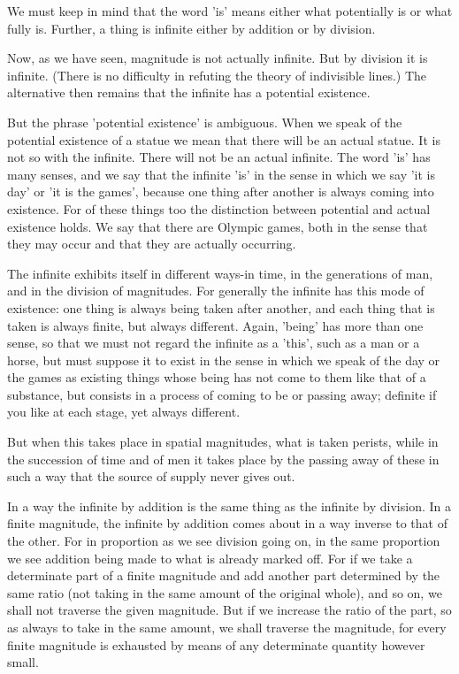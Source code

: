 We must keep in mind that the word 'is' means either what potentially
is or what fully is. Further, a thing is infinite either by addition
or by division. 

Now, as we have seen, magnitude is not actually infinite. But by division
it is infinite. (There is no difficulty in refuting the theory of
indivisible lines.) The alternative then remains that the infinite
has a potential existence. 

But the phrase 'potential existence' is ambiguous. When we speak of
the potential existence of a statue we mean that there will be an
actual statue. It is not so with the infinite. There will not be an
actual infinite. The word 'is' has many senses, and we say that the
infinite 'is' in the sense in which we say 'it is day' or 'it is the
games', because one thing after another is always coming into existence.
For of these things too the distinction between potential and actual
existence holds. We say that there are Olympic games, both in the
sense that they may occur and that they are actually occurring.

The infinite exhibits itself in different ways-in time, in the generations
of man, and in the division of magnitudes. For generally the infinite
has this mode of existence: one thing is always being taken after
another, and each thing that is taken is always finite, but always
different. Again, 'being' has more than one sense, so that we must
not regard the infinite as a 'this', such as a man or a horse, but
must suppose it to exist in the sense in which we speak of the day
or the games as existing things whose being has not come to them like
that of a substance, but consists in a process of coming to be or
passing away; definite if you like at each stage, yet always different.

But when this takes place in spatial magnitudes, what is taken perists,
while in the succession of time and of men it takes place by the passing
away of these in such a way that the source of supply never gives
out. 

In a way the infinite by addition is the same thing as the infinite
by division. In a finite magnitude, the infinite by addition comes
about in a way inverse to that of the other. For in proportion as
we see division going on, in the same proportion we see addition being
made to what is already marked off. For if we take a determinate part
of a finite magnitude and add another part determined by the same
ratio (not taking in the same amount of the original whole), and so
on, we shall not traverse the given magnitude. But if we increase
the ratio of the part, so as always to take in the same amount, we
shall traverse the magnitude, for every finite magnitude is exhausted
by means of any determinate quantity however small. 

